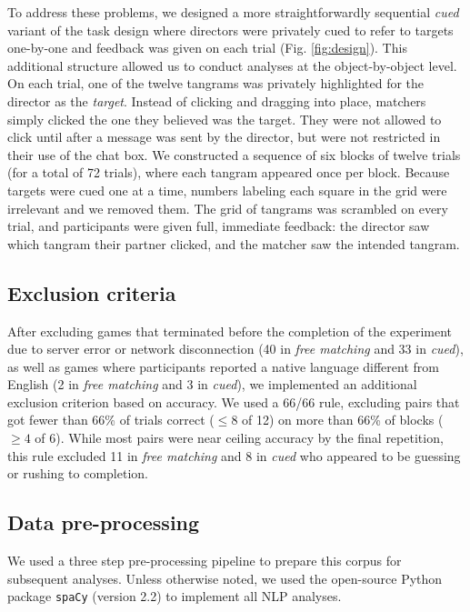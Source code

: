 \documentclass[alpha-refs]{wiley-article}
\begin{document}
To address these problems, we designed a more straightforwardly sequential \emph{cued} variant of the task design where directors were privately cued to refer to targets one-by-one and feedback was given on each trial (Fig. \ref{fig:design}).
This additional structure allowed us to conduct analyses at the object-by-object level.
On each trial, one of the twelve tangrams was privately highlighted for the director as the \emph{target}.
Instead of clicking and dragging into place, matchers simply clicked the one they believed was the target.
They were not allowed to click until after a message was sent by the director, but were not restricted in their use of the chat box.
We constructed a sequence of six blocks of twelve trials (for a total of 72 trials), where each tangram appeared once per block.
Because targets were cued one at a time, numbers labeling each square in the grid were irrelevant and we removed them.
The grid of tangrams was scrambled on every trial, and participants were given full, immediate feedback: the director saw which tangram their partner clicked, and the matcher saw the intended tangram.

\subsection{Exclusion criteria}

After excluding games that terminated before the completion of the experiment due to server error or network disconnection (40 in \emph{free matching} and 33 in \emph{cued}), as well as games where participants reported a native language different from English (2 in \emph{free matching} and 3 in \emph{cued}), we implemented an additional exclusion criterion based on accuracy.
We used a 66/66 rule, excluding pairs that got fewer than 66\% of trials correct ($\le8$ of 12)  on more than 66\% of blocks ($\ge4$ of 6).
While most pairs were near ceiling accuracy by the final repetition, this rule excluded 11 in \emph{free matching} and 8 in \emph{cued} who appeared to be guessing or rushing to completion.

\subsection{Data pre-processing}

We used a three step pre-processing pipeline to prepare this corpus for subsequent analyses. Unless otherwise noted, we used the open-source Python package \texttt{spaCy} (version 2.2) to implement all NLP analyses.
\end{document}
